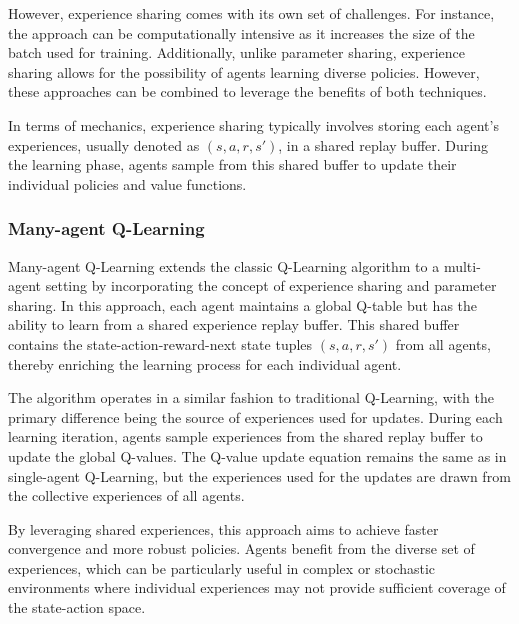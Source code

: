 However, experience sharing comes with its own set of challenges. 
 For instance, the approach can be computationally intensive as it increases the size of the batch used for training. Additionally, unlike parameter sharing, 
 experience sharing allows for the possibility of agents learning diverse policies. 
 However, these approaches can be combined to leverage the benefits of both techniques.

In terms of mechanics, 
 experience sharing typically involves storing each agent's experiences, 
 usually denoted as \( (s, a, r, s') \), in a shared replay buffer. 
 During the learning phase, agents sample from this shared buffer to update their individual policies and value functions. 

\subsubsection*{Many-agent Q-Learning}
Many-agent Q-Learning extends the classic Q-Learning algorithm to a multi-agent setting by incorporating the concept of experience sharing and parameter sharing. 
 In this approach, each agent maintains a global Q-table but has the ability to learn from a shared experience replay buffer. 
 This shared buffer contains the state-action-reward-next state tuples \( (s, a, r, s') \) from all agents, 
 thereby enriching the learning process for each individual agent.
 
The algorithm operates in a similar fashion to traditional Q-Learning, 
 with the primary difference being the source of experiences used for updates. 
 During each learning iteration, agents sample experiences from the shared replay buffer to update the global Q-values. 
 The Q-value update equation remains the same as in single-agent Q-Learning, 
 but the experiences used for the updates are drawn from the collective experiences of all agents.
 
By leveraging shared experiences, 
 this approach aims to achieve faster convergence and more robust policies. 
 Agents benefit from the diverse set of experiences, which can be particularly useful in complex or stochastic environments where individual experiences may not provide sufficient coverage of the state-action space.
  
